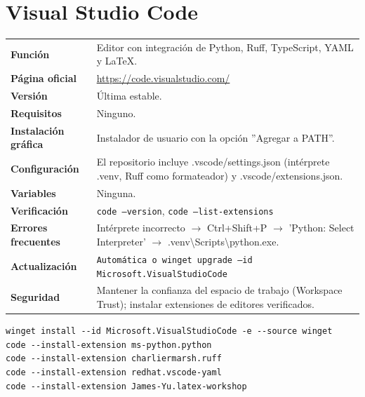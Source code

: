 \section{Visual Studio Code}
{\small\begin{tabularx}{\linewidth}{@{}>{\bfseries}p{2.9cm}X@{}}\toprule
Función & Editor con integración de Python, Ruff, TypeScript, YAML y LaTeX.\\
Página oficial & \url{https://code.visualstudio.com/}\\
Versión & Última estable.\\
Requisitos & Ninguno.\\
Instalación gráfica & Instalador de usuario con la opción ''Agregar a PATH''.\\
Configuración & El repositorio incluye .vscode/settings.json (intérprete .venv, Ruff como formateador) y .vscode/extensions.json.\\
Variables & Ninguna.\\
Verificación & \texttt{code --version}, \texttt{code --list-extensions}\\
Errores frecuentes & Intérprete incorrecto $\rightarrow$ Ctrl+Shift+P $\rightarrow$ 'Python: Select Interpreter' $\rightarrow$ .venv\textbackslash{}Scripts\textbackslash{}python.exe.\\
Actualización & \texttt{Automática o winget upgrade --id Microsoft.VisualStudioCode}\\
Seguridad & Mantener la confianza del espacio de trabajo (Workspace Trust); instalar extensiones de editores verificados.\\
\bottomrule\end{tabularx}}
\begin{lstlisting}[style=ps]
winget install --id Microsoft.VisualStudioCode -e --source winget
code --install-extension ms-python.python
code --install-extension charliermarsh.ruff
code --install-extension redhat.vscode-yaml
code --install-extension James-Yu.latex-workshop
\end{lstlisting}

